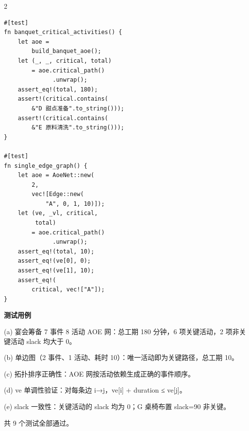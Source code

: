 {\begin{multicols}{2}
\begin{verbatim}
#[test]
fn banquet_critical_activities() {
    let aoe =
        build_banquet_aoe();
    let (_, _, critical, total)
        = aoe.critical_path()
              .unwrap();
    assert_eq!(total, 180);
    assert!(critical.contains(
        &"D 甜点准备".to_string()));
    assert!(critical.contains(
        &"E 原料清洗".to_string()));
}

#[test]
fn single_edge_graph() {
    let aoe = AoeNet::new(
        2,
        vec![Edge::new(
            "A", 0, 1, 10)]);
    let (ve, _vl, critical,
         total)
        = aoe.critical_path()
              .unwrap();
    assert_eq!(total, 10);
    assert_eq!(ve[0], 0);
    assert_eq!(ve[1], 10);
    assert_eq!(
        critical, vec!["A"]);
}
\end{verbatim}

\end{multicols}
}
{
\fontsize{7pt}{9pt}\selectfont
\setlength{\parindent}{0pt}
\noindent\textbf{测试用例}\par
\noindent (a) 宴会筹备 7 事件 8 活动 AOE 网：总工期 180 分钟，6 项关键活动，2 项非关键活动 slack 均大于 0。\par
\noindent (b) 单边图（2 事件、1 活动、耗时 10）：唯一活动即为关键路径，总工期 10。\par
\noindent (c) 拓扑排序正确性：AOE 网按活动依赖生成正确的事件顺序。\par
\noindent (d) ve 单调性验证：对每条边 i→j，ve[i] + duration ≤ ve[j]。\par
\noindent (e) slack 一致性：关键活动的 slack 均为 0；G 桌椅布置 slack=90 非关键。\par
\noindent 共 9 个测试全部通过。\par
}
